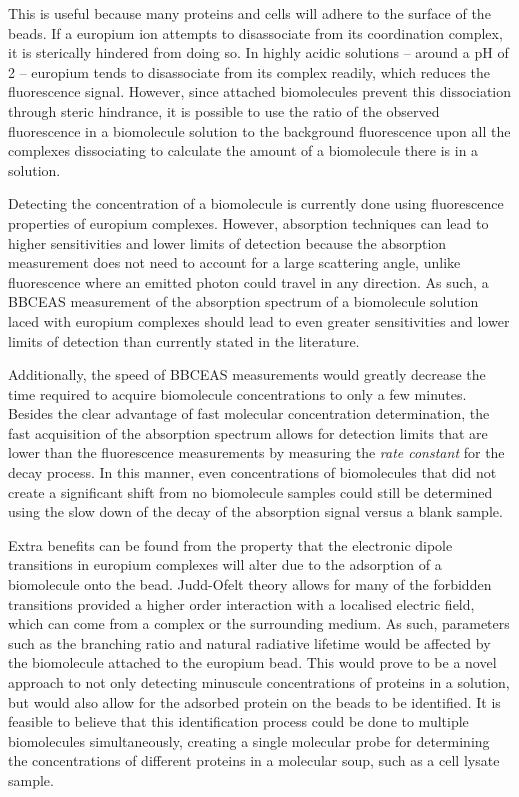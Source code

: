 This is useful because many proteins and cells will adhere to the surface of
the beads. If a europium ion attempts to disassociate from its coordination
complex, it is sterically hindered from doing so. In highly acidic solutions --
around a pH of 2 -- europium tends to disassociate from its complex readily,
which reduces the fluorescence signal. However, since attached biomolecules
prevent this dissociation through steric hindrance, it is possible to use the
ratio of the observed fluorescence in a biomolecule solution to the background
fluorescence upon all the complexes dissociating to calculate the amount of a
biomolecule there is in a solution.

Detecting the concentration of a biomolecule is currently done using
fluorescence properties of europium complexes. However, absorption techniques
can lead to higher sensitivities and lower limits of detection because the
absorption measurement does not need to account for a large scattering
angle, unlike fluorescence where an emitted photon could travel in any
direction. As such, a \ac{BBCEAS} measurement of the
absorption spectrum of a biomolecule solution laced with europium complexes
should lead to even greater sensitivities and lower limits of detection than
currently stated in the literature.

Additionally, the speed of \ac{BBCEAS} measurements would greatly decrease the
time required to acquire biomolecule concentrations to only a few minutes.
Besides the clear advantage of fast molecular concentration determination, the
fast acquisition of the absorption spectrum allows for detection limits that
are lower than the fluorescence measurements by measuring the \emph{rate
constant} for the decay process. In this manner, even concentrations of
biomolecules that did not create a significant shift from no biomolecule
samples could still be determined using the slow down of the decay of the
absorption signal versus a blank sample.

Extra benefits can be found from the property that the electronic dipole
transitions in europium complexes will alter due to the adsorption of a
biomolecule onto the bead. Judd-Ofelt theory allows for many of the forbidden
transitions provided a higher order interaction with a localised electric
field, which can come from a complex or the surrounding medium. As such,
parameters such as the branching ratio and natural radiative lifetime would be
affected by the biomolecule attached to the europium bead. This would prove to
be a novel approach to not only detecting minuscule concentrations of proteins
in a solution, but would also allow for the adsorbed protein on the beads to
be identified. It is feasible to believe that this identification process
could be done to multiple biomolecules simultaneously, creating a single
molecular probe for determining the concentrations of different proteins in a
molecular soup, such as a cell lysate sample.

